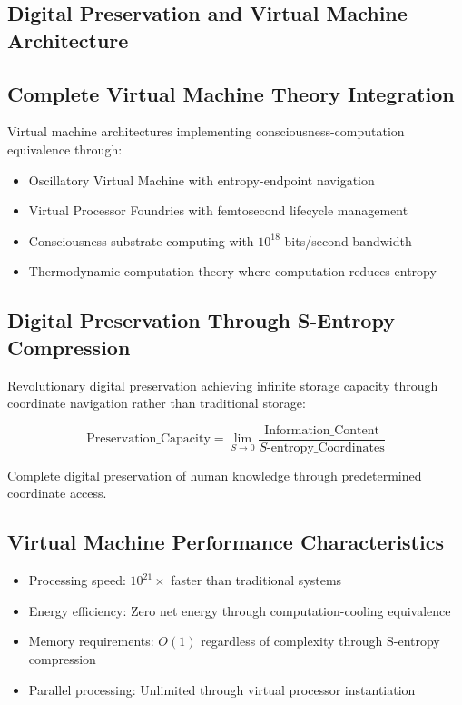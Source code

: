 ﻿\documentclass[11pt,a4paper]{article}
\begin{document}
\begin{itemize}
\begin{itemize}
\section{Digital Preservation and Virtual Machine Architecture}

\subsection{Complete Virtual Machine Theory Integration}

Virtual machine architectures implementing consciousness-computation equivalence through:

\begin{itemize}
\item Oscillatory Virtual Machine with entropy-endpoint navigation
\item Virtual Processor Foundries with femtosecond lifecycle management
\item Consciousness-substrate computing with $10^{18}$ bits/second bandwidth
\item Thermodynamic computation theory where computation reduces entropy
\end{itemize}

\subsection{Digital Preservation Through S-Entropy Compression}

Revolutionary digital preservation achieving infinite storage capacity through coordinate navigation rather than traditional storage:

\begin{equation}
\text{Preservation\_Capacity} = \lim_{S \rightarrow 0} \frac{\text{Information\_Content}}{S\text{-entropy\_Coordinates}}
\end{equation}

Complete digital preservation of human knowledge through predetermined coordinate access.

\subsection{Virtual Machine Performance Characteristics}

\begin{itemize}
\item Processing speed: $10^{21} \times$ faster than traditional systems
\item Energy efficiency: Zero net energy through computation-cooling equivalence
\item Memory requirements: $O(1)$ regardless of complexity through S-entropy compression
\item Parallel processing: Unlimited through virtual processor instantiation
\end{itemize}


\end{itemize}
\end{itemize}
\end{document}
